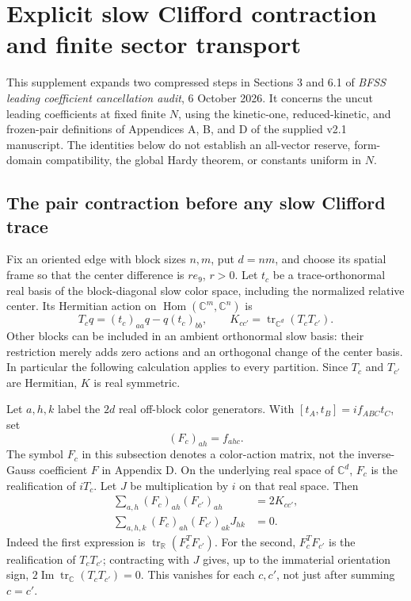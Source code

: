 
\section{Explicit slow Clifford contraction and finite sector transport}
\label{auditadd:section}
This supplement expands two compressed steps in Sections 3 and 6.1 of
\emph{BFSS leading coefficient cancellation audit}, 6 October 2026.
It concerns the uncut leading coefficients at fixed finite $N$, using the
kinetic-one, reduced-kinetic, and frozen-pair definitions of Appendices
A, B, and D of the supplied v2.1 manuscript. The identities below do not
establish an all-vector reserve, form-domain compatibility, the global
Hardy theorem, or constants uniform in $N$.

\subsection{The pair contraction before any slow Clifford trace}
Fix an oriented edge with block sizes $n,m$, put $d=nm$, and choose its
spatial frame so that the center difference is $r e_9$, $r>0$.
Let $t_c$ be a trace-orthonormal real basis of the block-diagonal slow
color space, including the normalized relative center. Its Hermitian
action on $\operatorname{Hom}(\mathbb C^m,\mathbb C^n)$ is
\[
 T_c q=(t_c)_{aa}q-q(t_c)_{bb},\qquad
 K_{cc'}=\operatorname{tr}_{\mathbb C^d}(T_cT_{c'}).
\]
Other blocks can be included in an ambient orthonormal slow basis: their
restriction merely adds zero actions and an orthogonal change of the
center basis. In particular the following calculation applies to every
partition. Since $T_c$ and $T_{c'}$ are Hermitian, $K$ is real symmetric.

Let $a,h,k$ label the $2d$ real off-block color generators. With
$[t_A,t_B]=i f_{ABC}t_C$, set
\[
 (F_c)_{ah}=f_{ahc}.
\]
The symbol $F_c$ in this subsection denotes a color-action matrix, not
the inverse-Gauss coefficient $F$ in Appendix D. On the underlying real
space of $\mathbb C^d$, $F_c$ is the realification of $iT_c$. Let $J$ be
multiplication by $i$ on that real space. Then
\begin{align}
 \sum_{a,h}(F_c)_{ah}(F_{c'})_{ah}&=2K_{cc'},
       \tag{A0a}\label{auditadd:color-real}\\
 \sum_{a,h,k}(F_c)_{ah}(F_{c'})_{ak}J_{hk}&=0.
       \tag{A0b}\label{auditadd:color-polarization}
\end{align}
Indeed the first expression is $\operatorname{tr}_{\mathbb R}(F_c^T F_{c'})$.
For the second, $F_c^T F_{c'}$ is the realification of $T_cT_{c'}$;
contracting with $J$ gives, up to the immaterial orientation sign,
$2\operatorname{Im}\operatorname{tr}_{\mathbb C}(T_cT_{c'})=0$.
This vanishes for each $c,c'$, not just after summing $c=c'$.

